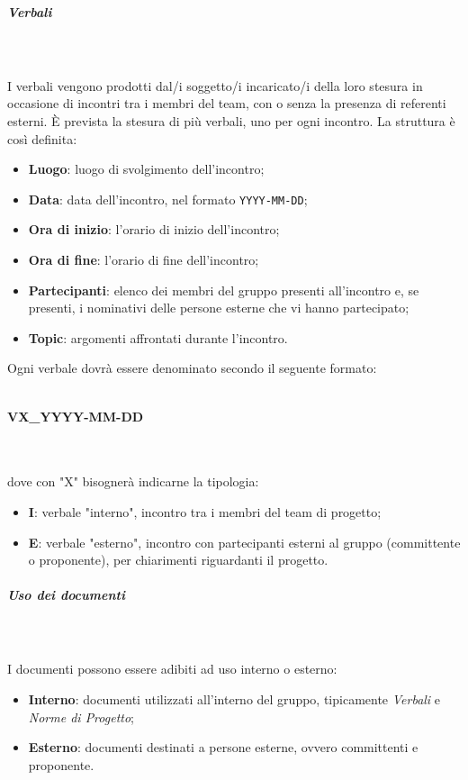 \subparagraph{Verbali} \label{par:verbali}\mbox{} \\ \mbox{} \\
I verbali vengono prodotti dal/i soggetto/i incaricato/i della loro stesura in occasione di incontri tra i membri del team, con o senza la presenza di referenti esterni. È prevista la stesura di più verbali, uno per ogni incontro.
La struttura è così definita: \begin{itemize}
\item \textbf{Luogo}: luogo di svolgimento dell'incontro;
\item \textbf{Data}: data dell'incontro, nel formato \texttt{YYYY-MM-DD};
\item \textbf{Ora di inizio}: l'orario di inizio dell'incontro;
\item \textbf{Ora di fine}: l'orario di fine dell'incontro;
\item \textbf{Partecipanti}: elenco dei membri del gruppo presenti all'incontro e, se presenti, i nominativi delle persone esterne che vi hanno partecipato;
\item \textbf{Topic}: argomenti affrontati durante l'incontro.
\end{itemize}
Ogni verbale dovrà essere denominato secondo il seguente formato: \\ \\
\centerline{\textbf{VX\_YYYY-MM-DD}} \\ \\
dove con "X" bisognerà indicarne la tipologia: \begin{itemize}
\item \textbf{I}: verbale "interno", incontro tra i membri del team di progetto;
\item \textbf{E}: verbale "esterno", incontro con partecipanti esterni al gruppo (committente o proponente), per chiarimenti riguardanti il progetto.
\end{itemize}

\subparagraph{Uso dei documenti}\mbox{} \\ \mbox{} \\
I documenti possono essere adibiti ad uso interno o esterno:
\begin{itemize}
\item \textbf{Interno}: documenti utilizzati all'interno del gruppo, tipicamente \textit{Verbali} e \textit{Norme di Progetto};
\item \textbf{Esterno}: documenti destinati a persone esterne, ovvero committenti e proponente.
\end{itemize}

